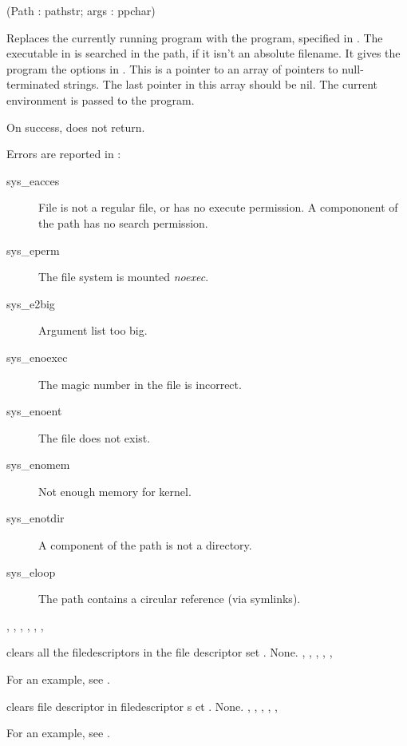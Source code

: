 

{(Path : pathstr; args : ppchar)}
{
Replaces the currently running program with the program, specified in
. The executable in  is searched in the path, if it isn't
an absolute filename.
It gives the program the options in . This is a pointer to an array of pointers to null-terminated
strings. The last pointer in this array should be nil.
The current environment is passed to the program.

On success,  does not return.
}
{Errors are reported in :
\begin{description}
\item[sys\_eacces] File is not a regular file, or has no execute permission.
A compononent of the path has no search permission.
\item[sys\_eperm] The file system is mounted \textit{noexec}.
\item[sys\_e2big] Argument list too big.
\item[sys\_enoexec] The magic number in the file is incorrect.
\item[sys\_enoent] The file does not exist.
\item[sys\_enomem] Not enough memory for kernel.
\item[sys\_enotdir] A component of the path is not a directory.
\item[sys\_eloop] The path contains a circular reference (via symlinks).
\end{description}}
{, , ,
, , ,  }




{ clears all the filedescriptors in the file descriptor 
set .}
{None.}
{, 
, 
, 
,
, 
}

For an example, see .

{  clears file descriptor  in filedescriptor s
  et .}
{None.}
{, 
, 
,
, 
, 
}

For an example, see .

